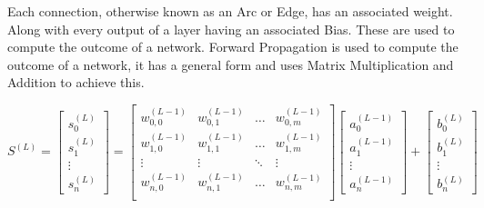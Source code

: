 \begin{flushleft}
\begin{enumerate}
\begin{enumerate}
                    Each connection, otherwise known as an Arc or Edge, has an associated weight. Along with every output of a
                    layer having an associated Bias. These are used to compute the outcome of a network.
                    \vspace{0.2cm}
                    Forward Propagation is used to compute the outcome of a network, it has a general form and uses 
                    Matrix Multiplication and Addition to achieve this.
                    \vspace{0.2cm}
                    
                    \begin{center}
                        $
                        S^{(L)} = 
                        \begin{bmatrix}
                        s^{(L)}_{0} \\
                        s^{(L)}_{1} \\
                        \vdots      \\
                        s^{(L)}_{n} 
                        \end{bmatrix}
                        = 
                        \begin{bmatrix}
                        w^{(L-1)}_{0,0} & w^{(L-1)}_{0,1} & \hdots  & w^{(L-1)}_{0,m} \\
                        w^{(L-1)}_{1,0} & w^{(L-1)}_{1,1} & \hdots  & w^{(L-1)}_{1,m} \\
                        \vdots          & \vdots          & \ddots  & \vdots          \\
                        w^{(L-1)}_{n,0} & w^{(L-1)}_{n,1} & \hdots  & w^{(L-1)}_{n,m} \\
                        \end{bmatrix}
                        \begin{bmatrix}
                        a^{(L-1)}_{0} \\
                        a^{(L-1)}_{1} \\
                        \vdots      \\
                        a^{(L-1)}_{n} 
                        \end{bmatrix}
                        +
                        \begin{bmatrix}
                        b^{(L)}_{0} \\
                        b^{(L)}_{1} \\
                        \vdots      \\
                        b^{(L)}_{n} 
                        \end{bmatrix}
                        $ 
                    \end{center}
                    

\end{enumerate}
\end{enumerate}
\end{flushleft}
